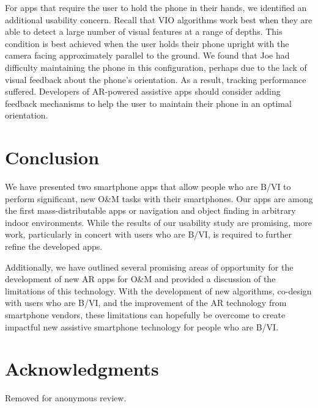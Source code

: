 \documentclass[chi_draft]{sigchi}
\newcommand{\BVI}{B/VI\xspace}
\newcommand{\OM}{O\&M\xspace}
\begin{document}
For apps that require the user to hold the phone in their hands, we identified an additional usability concern.  Recall that VIO algorithms work best when they are able to detect a large number of visual features at a range of depths.  This condition is best achieved when the user holds their phone upright with the camera facing approximately parallel to the ground.  We found that Joe had difficulty maintaining the phone in this configuration, perhaps due to the lack of visual feedback about the phone's orientation.  As a result, tracking performance suffered.  Developers of AR-powered assistive apps should consider adding feedback mechanisms to help the user to maintain their phone in an optimal orientation. 
\balance{}

\section{Conclusion}
We have presented two smartphone apps that allow people who are \BVI to perform significant, new \OM tasks with their smartphones.  Our apps are among the first mass-distributable apps or navigation and object finding in arbitrary indoor environments.  While the results of our usability study are promising, more work, particularly in concert with users who are \BVI, is required to further refine the developed apps.

Additionally, we have outlined several promising areas of opportunity for the development of new AR apps for \OM and provided a discussion of the limitations of this technology.  With the development of new algorithms, co-design with users who are \BVI, and the improvement of the AR technology from smartphone vendors, these limitations can hopefully be overcome to create impactful new assistive smartphone technology for people who are \BVI.  

\section{Acknowledgments}
Removed for anonymous review.


\newpage


\end{document}

